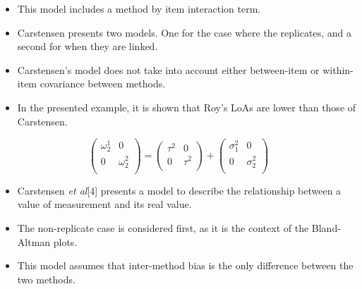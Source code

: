 %
\begin{itemize}
\item This model includes a method by item interaction term.\\

\item Carstensen presents two models. One for the case where the replicates, and a second for when they are linked.\\
\item Carstensen's model does not take into account either between-item or within-item covariance between methods.\\
\item In the presented example, it is shown that Roy's LoAs are lower than those of Carstensen.
\end{itemize}



\[\left(\begin{array}{cc}
                \omega^1_2  & 0 \\
              0 & \omega^2_2 \\
            \end{array}  \right)
            =  \left(
            \begin{array}{cc}
              \tau^2  & 0 \\
              0 & \tau^2 \\
            \end{array} \right)+
            \left(
            \begin{array}{cc}
              \sigma^2_1  & 0 \\
              0 & \sigma^2_2 \\
            \end{array}\right)
\]






%
\begin{itemize}
\item Carstensen \textit{et al}[4] presents a model to describe the relationship between a value of measurement and its real value.
\item The non-replicate case is considered first, as it is the context of the Bland-Altman plots.
\item This model assumes that inter-method bias is the only difference between the two methods.
\end{itemize}


